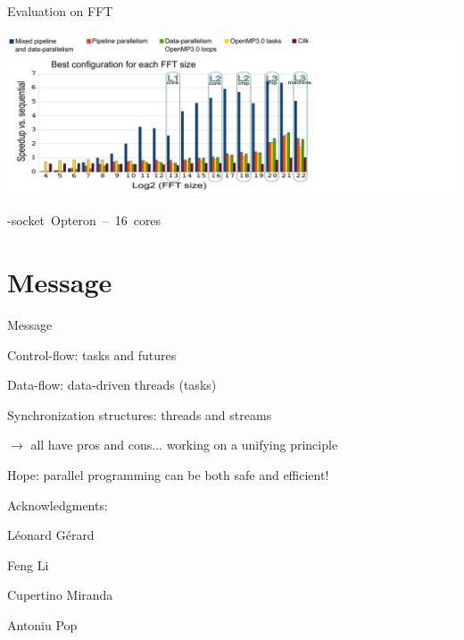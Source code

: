 \documentclass[xcolor=dvipsnames,9pt,mathserif]{beamer}
\begin{document}
\begin{frame}[fragile]{Evaluation on FFT}
  \begin{center}
    \includegraphics[width=1.4\columnwidth]{fft_opteron.pdf}

    -socket~Opteron~--~16~cores
  \end{center}
\end{frame}

\section{Message}

\begin{frame}{Message}
  \begin{alertblock}{}
    Control-flow: tasks and futures

    Data-flow: data-driven threads (tasks)

    Synchronization structures: threads and streams

    \medskip
    \centerline{$\to$ all have pros and cons... working on a unifying principle}
  \end{alertblock}
  
  \begin{alertblock}{}
    \Large\color{darkgreen}
    Hope: parallel programming can be both safe and efficient!
  \end{alertblock}

  \bigskip
  Acknowledgments:
  
  \medskip
  \qquad\begin{minipage}{5cm}
    Léonard Gérard
    
    Feng Li
    
    Cupertino Miranda
    
    Antoniu Pop
  \end{minipage}
\end{frame}



\end{document}
